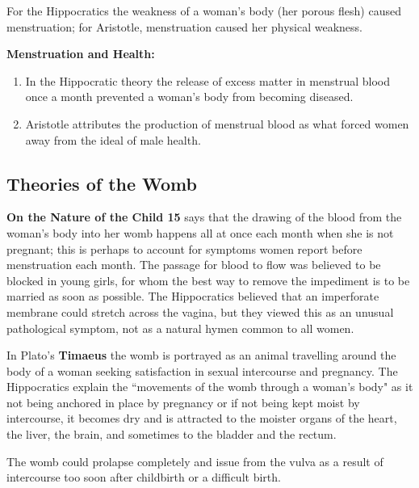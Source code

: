 \begin{rmk}
    For the Hippocratics the weakness of a woman's body (her porous flesh) caused menstruation; for Aristotle, menstruation caused her physical weakness.
\end{rmk}

\textbf{Menstruation and Health:}
\begin{enumerate}
    \item In the Hippocratic theory the release of excess matter in menstrual blood once a month prevented a woman's body from becoming diseased.
    \item Aristotle attributes the production of menstrual blood as what forced women away from the ideal of male health.
\end{enumerate}


\subsection{Theories of the Womb}

\textbf{On the Nature of the Child 15} says that the drawing of the blood from the woman's body into her womb happens all at once each month when she is not pregnant; this is perhaps to account for symptoms women report before menstruation each month. The passage for blood to flow was believed to be blocked in young girls, for whom the best way to remove the impediment is to be married as soon as possible. The Hippocratics believed that an imperforate membrane could stretch across the vagina, but they viewed this as an unusual pathological symptom, not as a natural hymen common to all women.

\begin{rmk}
    In Plato's \textbf{Timaeus} the womb is portrayed as an animal travelling around the body of a woman seeking satisfaction in sexual intercourse and pregnancy. The Hippocratics explain the ``movements of the womb through a woman's body" as it not being anchored in place by pregnancy or if not being kept moist by intercourse, it becomes dry and is attracted to the moister organs of the heart, the liver, the brain, and sometimes to the bladder and the rectum.
\end{rmk}

\begin{rmk}
    The womb could prolapse completely and issue from the vulva as a result of intercourse too soon after childbirth or a difficult birth.
\end{rmk}

